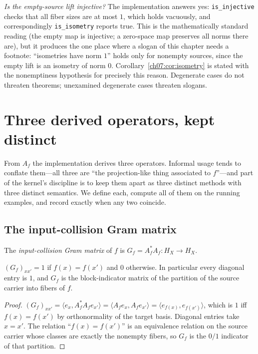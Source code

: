 \emph{Is the empty-source lift injective?} The implementation answers yes:
\texttt{is\_injective} checks that all fiber sizes are at most $1$, which
holds vacuously, and correspondingly \texttt{is\_isometry} reports true.
This is the mathematically standard reading (the empty map is injective; a
zero-space map preserves all norms there are), but it produces the one
place where a slogan of this chapter needs a footnote: ``isometries have
norm $1$'' holds only for nonempty sources, since the empty lift is an
isometry of norm $0$. Corollary~\ref{ch07:cor:isometry} is stated with the
nonemptiness hypothesis for precisely this reason. Degenerate cases do not
threaten theorems; unexamined degenerate cases threaten slogans.

\section{Three derived operators, kept distinct}\label{ch07:sec:derived}

From $A_f$ the implementation derives three operators. Informal usage tends
to conflate them---all three are ``the projection-like thing associated to
$f$''---and part of the kernel's discipline is to keep them apart as three
distinct methods with three distinct semantics. We define each, compute all
of them on the running examples, and record exactly when any two coincide.

\subsection{The input-collision Gram matrix}

\begin{definition}\label{ch07:def:inputgram}
The \emph{input-collision Gram matrix} of $f$ is
$G_f = A_f^* A_f : H_X\to H_X$.
\end{definition}

\begin{proposition}\label{ch07:prop:gramentries}
$(G_f)_{x x'} = 1$ if $f(x)=f(x')$ and $0$ otherwise. In particular every
diagonal entry is $1$, and $G_f$ is the block-indicator matrix of the
partition of the source carrier into fibers of $f$.
\end{proposition}

\begin{proof}
$(G_f)_{xx'}=\langle e_x, A_f^*A_f e_{x'}\rangle
=\langle A_f e_x, A_f e_{x'}\rangle
=\langle e_{f(x)}, e_{f(x')}\rangle$,
which is $1$ iff $f(x)=f(x')$ by orthonormality of the target basis.
Diagonal entries take $x=x'$. The relation ``$f(x)=f(x')$'' is an
equivalence relation on the source carrier whose classes are exactly the
nonempty fibers, so $G_f$ is the $0/1$ indicator of that partition.
\end{proof}

